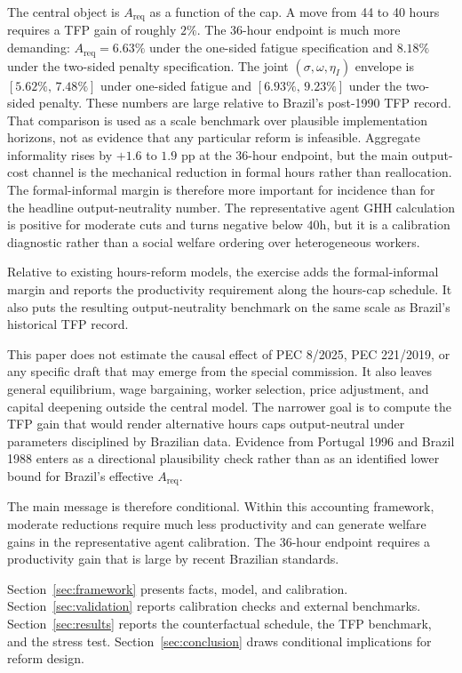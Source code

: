 The central object is $A_{\text{req}}$ as a function of the cap. A move from 44 to 40 hours requires a TFP gain of roughly $2\%$. The 36-hour endpoint is much more demanding: $A_{\text{req}}=6.63\%$ under the one-sided fatigue specification and $8.18\%$ under the two-sided penalty specification. The joint $(\sigma,\omega,\eta_I)$ envelope is $[5.62\%,\,7.48\%]$ under one-sided fatigue and $[6.93\%,\,9.23\%]$ under the two-sided penalty. These numbers are large relative to Brazil's post-1990 TFP record. That comparison is used as a scale benchmark over plausible implementation horizons, not as evidence that any particular reform is infeasible. Aggregate informality rises by $+1.6$ to $1.9$ pp at the 36-hour endpoint, but the main output-cost channel is the mechanical reduction in formal hours rather than reallocation. The formal-informal margin is therefore more important for incidence than for the headline output-neutrality number. The representative agent GHH calculation is positive for moderate cuts and turns negative below $40$h, but it is a calibration diagnostic rather than a social welfare ordering over heterogeneous workers.

Relative to existing hours-reform models, the exercise adds the formal-informal margin and reports the productivity requirement along the hours-cap schedule. It also puts the resulting output-neutrality benchmark on the same scale as Brazil's historical TFP record.

This paper does not estimate the causal effect of PEC 8/2025, PEC 221/2019, or any specific draft that may emerge from the special commission. It also leaves general equilibrium, wage bargaining, worker selection, price adjustment, and capital deepening outside the central model. The narrower goal is to compute the TFP gain that would render alternative hours caps output-neutral under parameters disciplined by Brazilian data. Evidence from Portugal 1996 \citep{AsaiLopesTondini2024} and Brazil 1988 \citep{GonzagaMenezesFilhoCamargo2003} enters as a directional plausibility check rather than as an identified lower bound for Brazil's effective $A_{\text{req}}$.

The main message is therefore conditional. Within this accounting framework, moderate reductions require much less productivity and can generate welfare gains in the representative agent calibration. The 36-hour endpoint requires a productivity gain that is large by recent Brazilian standards.

Section~\ref{sec:framework} presents facts, model, and calibration. Section~\ref{sec:validation} reports calibration checks and external benchmarks. Section~\ref{sec:results} reports the counterfactual schedule, the TFP benchmark, and the stress test. Section~\ref{sec:conclusion} draws conditional implications for reform design.
